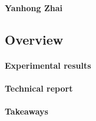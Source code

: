 \documentclass[11pt]{article}
\begin{document}
\paragraph{Yanhong Zhai}

\subsection{Overview}

\paragraph{Experimental results}

\paragraph{Technical report}

\paragraph{Takeaways}



\newpage
 
\end{document}
